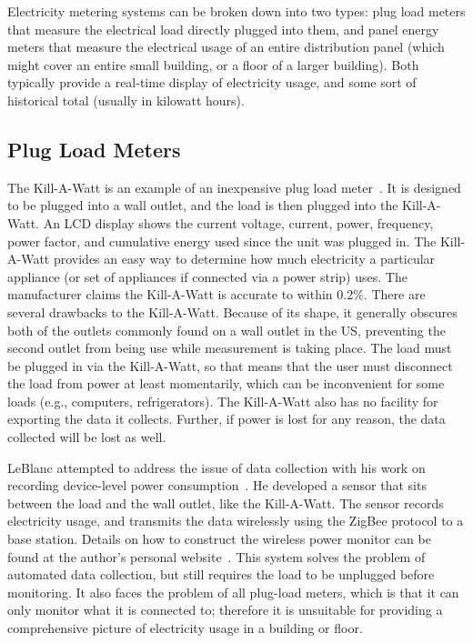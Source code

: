 Electricity metering systems can be broken down into two types: plug load meters that measure the electrical load directly plugged into them, and panel energy meters that measure the electrical usage of an entire distribution panel (which might cover an entire small building, or a floor of a larger building). Both typically provide a real-time display of electricity usage, and some sort of historical total (usually in kilowatt hours).

\subsection{Plug Load Meters}
\label{sec:plug-load-meters}

The Kill-A-Watt is an example of an inexpensive plug load meter~\cite{kill-a-watt}. It is designed to be plugged into a wall outlet, and the load is then plugged into the Kill-A-Watt. An LCD display shows the current voltage, current, power, frequency, power factor, and cumulative energy used since the unit was plugged in. The Kill-A-Watt provides an easy way to determine how much electricity a particular appliance (or set of appliances if connected via a power strip) uses. The manufacturer claims the Kill-A-Watt is accurate to within 0.2\%. There are several drawbacks to the Kill-A-Watt. Because of its shape, it generally obscures both of the outlets commonly found on a wall outlet in the US, preventing the second outlet from being use while measurement is taking place. The load must be plugged in via the Kill-A-Watt, so that means that the user must disconnect the load from power at least momentarily, which can be inconvenient for some loads (e.g., computers, refrigerators). The Kill-A-Watt also has no facility for exporting the data it collects. Further, if power is lost for any reason, the data collected will be lost as well.

LeBlanc attempted to address the issue of data collection with his work on recording device-level power consumption~\cite{leblanc-2007}. He developed a sensor that sits between the load and the wall outlet, like the Kill-A-Watt. The sensor records electricity usage, and transmits the data wirelessly using the ZigBee protocol to a base station. Details on how to construct the wireless power monitor can be found at the author's personal website~\cite{LeBlanc2008power-mon-howto}. This system solves the problem of automated data collection, but still requires the load to be unplugged before monitoring. It also faces the problem of all plug-load meters, which is that it can only monitor what it is connected to; therefore it is unsuitable for providing a comprehensive picture of electricity usage in a building or floor.


